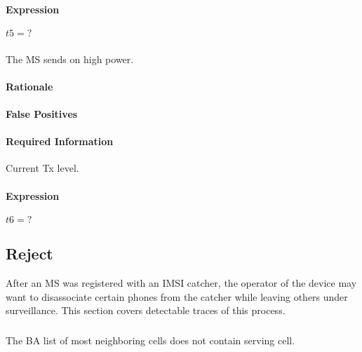 \documentclass[a4paper,11pt,notitlepage,bigheadings,oneside]{scrartcl}
\begin{document}

\paragraph{Expression}

$t5 = ?$

\subsubsection{}

The MS sends on high power.

\paragraph{Rationale}


\paragraph{False Positives}


\paragraph{Required Information}

Current Tx level.

\paragraph{Expression}

$t6 = ?$

\subsection{Reject}

After an MS was registered with an IMSI catcher, the operator of the device may
want to disassociate certain phones from the catcher while leaving others under
surveillance. This section covers detectable traces of this process.

\subsubsection{}

The BA list of most neighboring cells does not contain serving cell.
\end{document}
